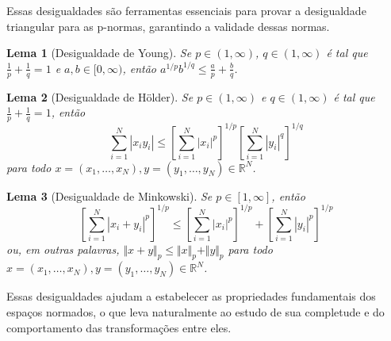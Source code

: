 \documentclass[11pt]{article}
\theoremstyle{yellowhead}
\newtheorem*{lemma}{Lema}
\theoremstyle{yellowdef}
\begin{document}
\begin{multicols}{3}
Essas desigualdades são ferramentas essenciais para provar a desigualdade triangular para as p-normas, garantindo a validade dessas normas.

\begin{lemma}[Desigualdade de Young]
Se $p \in (1, \infty)$, $q \in (1, \infty)$ é tal que $\frac{1}{p} + \frac{1}{q} = 1$ e $a, b \in [0, \infty)$, então $a^{1/p} b^{1/q} \le \frac{a}{p} + \frac{b}{q}$.
\end{lemma}

\begin{lemma}[Desigualdade de Hölder]
Se $p \in (1, \infty)$ e $q \in (1, \infty)$ é tal que $\frac{1}{p} + \frac{1}{q} = 1$, então
\[
\sum_{i=1}^{N} |x_i y_i| \le \left[ \sum_{i=1}^{N} |x_i|^p \right]^{1/p} \left[ \sum_{i=1}^{N} |y_i|^q \right]^{1/q}
\]
para todo $x = (x_1, \dots, x_N), y = (y_1, \dots, y_N) \in \mathbb{R}^N$.
\end{lemma}

\begin{lemma}[Desigualdade de Minkowski]
Se $p \in [1, \infty]$, então
\[
\left[ \sum_{i=1}^{N} |x_i + y_i|^p \right]^{1/p} \le \left[ \sum_{i=1}^{N} |x_i|^p \right]^{1/p} + \left[ \sum_{i=1}^{N} |y_i|^p \right]^{1/p}
\]
ou, em outras palavras, $\Vert x + y \Vert_p \le \Vert x \Vert_p + \Vert y \Vert_p$ para todo $x = (x_1, \dots, x_N), y = (y_1, \dots, y_N) \in \mathbb{R}^N$.
\end{lemma}

Essas desigualdades ajudam a estabelecer as propriedades fundamentais dos espaços normados, o que leva naturalmente ao estudo de sua completude e do comportamento das transformações entre eles.
\end{multicols}
\end{document}
